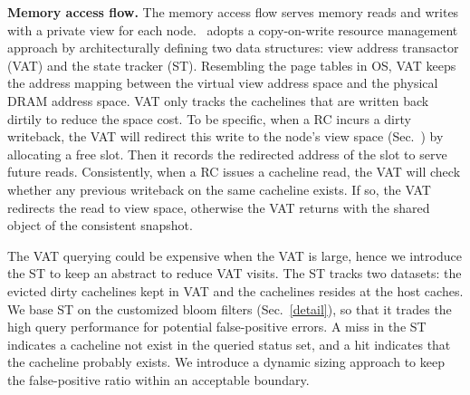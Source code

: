 \noindent \textbf{Memory access flow. } 
The memory access flow serves memory reads and writes with a private view for each node. \name~adopts a copy-on-write resource management approach by architecturally defining two data structures: view address transactor (VAT) and the state tracker (ST). 
Resembling the page tables in OS, VAT keeps the address mapping between the virtual view address space and the physical DRAM address space. 
VAT only tracks the cachelines that are written back dirtily to reduce the space cost. 
To be specific, when a RC incurs a dirty writeback, the VAT will redirect this write to the node's view space (Sec.~\cite{detail}) by allocating a free slot. 
Then it records the redirected address of the slot to serve future reads. Consistently, when a RC issues a cacheline read, the VAT will check whether any previous writeback on the same cacheline exists. If so, the VAT redirects the read to view space, otherwise the VAT returns with the shared object of the consistent snapshot. 

The VAT querying could be expensive when the VAT is large, hence we introduce the ST to keep an abstract to reduce VAT visits. 
The ST tracks two datasets: the evicted dirty cachelines kept in VAT and the cachelines resides at the host caches. We base ST on the customized bloom filters (Sec.~\ref{detail}), so that it trades the high query performance for potential false-positive errors. A miss in the ST indicates a cacheline not exist in the queried status set, and a hit indicates that the cacheline probably exists. We introduce a dynamic sizing approach to keep the false-positive ratio within an acceptable boundary. 
\fi



